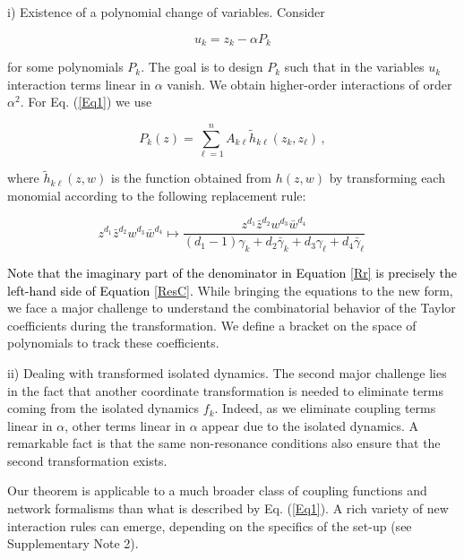 \documentclass[12pt]{article}
\theoremstyle{plain}
\theoremstyle{definition}
\theoremstyle{remark}
\theoremstyle{remark}
\begin{document}
i) Existence of a polynomial change of variables.
 Consider
\begin{linenomath}
\begin{equation}
u_k = z_k - \alpha P_k
\end{equation}
\end{linenomath}
for some polynomials $P_k$. The goal is to design $P_k$  such that in the variables $u_k$ interaction terms linear in $\alpha$ vanish. We obtain higher-order interactions of order $\alpha^2$. For Eq. (\ref{Eq1}) we use
\begin{linenomath}
\begin{equation}\label{Trans}
P_k(z) = \sum_{\ell =1}^n A_{k \ell}  \tilde{h}_{k \ell} (z_k, z_{\ell})\, ,
\end{equation}
\end{linenomath}
where $\tilde{h}_{k \ell}(z, w)$ is the function obtained from $h(z, w)$ by  transforming each monomial  according to the following replacement rule:
\begin{linenomath}
\begin{equation}\label{Rr}
z^{d_1}\bar{z}^{d_2}w^{d_3}\bar{w}^{d_4} \mapsto\frac{z^{d_1}\bar{z}^{d_2}w^{d_3}\bar{w}^{d_4}}{(d_1-1)\gamma_k + d_2\bar{\gamma}_k + d_3\gamma_{\ell} + d_4\bar{\gamma}_{\ell} }\,
\end{equation}
\end{linenomath}

\textcolor{black}{Note that the imaginary part of the denominator in Equation \eqref{Rr} is precisely the left-hand side of Equation \eqref{ResC}. }While bringing the equations to the new form, we face a major challenge  to understand the combinatorial behavior of the Taylor coefficients during the transformation. We define a bracket on the space of polynomials to track these coefficients. 

ii) Dealing with transformed isolated dynamics. The  second major challenge lies in the fact that another coordinate transformation is needed to eliminate terms coming from the isolated dynamics $f_k$. Indeed, as we eliminate coupling terms linear in $\alpha$, other terms linear in $\alpha$ appear due to the isolated dynamics. A remarkable fact is that the same non-resonance conditions also ensure that the second transformation exists. 


Our theorem is applicable to a much broader class of coupling functions and network formalisms than what is described by Eq. (\ref{Eq1}). A rich variety of new interaction rules can emerge, depending on the specifics of the set-up (see Supplementary Note 2). 
\end{document}
